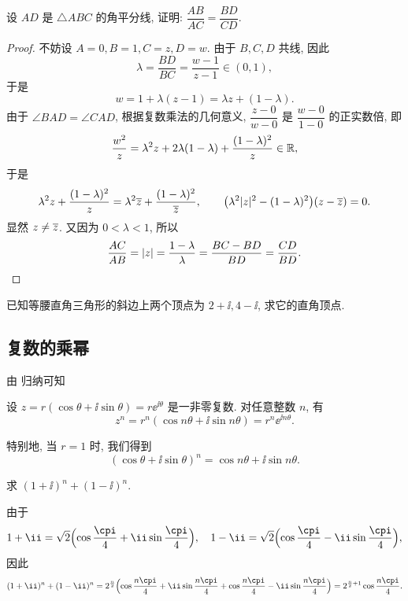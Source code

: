 \begin{example}
  设 $AD$ 是 $\triangle ABC$ 的角平分线, 证明: $\dfrac{AB}{AC}=\dfrac{BD}{CD}$.
\end{example}

\begin{proof}
  不妨设 $A=0,B=1,C=z,D=w$. 由于 $B,C,D$ 共线, 因此
  \[
     \lambda
    =\frac{BD}{BC}
    =\frac{w-1}{z-1}\in(0,1),
  \]
  于是
  \[
     w
    =1+\lambda(z-1)
    =\lambda z+(1-\lambda).
  \]
  由于 $\angle BAD=\angle CAD$, 根据复数乘法的几何意义,
  $\dfrac{z-0}{w-0}$ 是 $\dfrac{w-0}{1-0}$ 的正实数倍, 即
  \[
     \frac{w^2}z
    =\lambda^2 z+2\lambda(1-\lambda)+\frac{(1-\lambda)^2}z\in{\mathbb{R}},
  \]
  于是
  \[
     \lambda^2z+\frac{(1-\lambda)^2}z
    =\lambda^2\overline z+\frac{(1-\lambda)^2}{\overline z},\qquad
    \bigl(\lambda^2|z|^2-(1-\lambda)^2\bigr)(z-\overline z)=0.
  \]
  显然 $z\neq \overline z$.
  又因为 $0<\lambda<1$, 所以
  \[
     \frac{AC}{AB}
    =|z|
    =\frac{1-\lambda}{\lambda}
    =\frac{BC-BD}{BD}
    =\frac{CD}{BD}.\qedhere
  \]
\end{proof}

\begin{exercise}
  已知等腰直角三角形的斜边上两个顶点为 $2+\ii,4-\ii$, 求它的直角顶点.
\end{exercise}


\subsection{复数的乘幂}

由 归纳可知
\begin{theorem}
  设 $z=r(\cos\theta+\ii\sin\theta)=r\ee^{\ii\theta}$ 是一非零复数.
  对任意整数 $n$, 有
  \[
    z^n=r^n(\cos{n\theta}+\ii\sin{n\theta})
    =r^n\ee^{\ii n\theta}.
  \]
\end{theorem}
特别地, 当 $r=1$ 时, 我们得到
\[
  (\cos\theta+\ii\sin\theta)^n=\cos{n\theta}+\ii\sin{n\theta}.
\]

\begin{example}
  求 $(1+\ii)^n+(1-\ii)^n$.
\end{example}

\begin{solution}
  由于
  \[
    1+\ii=\sqrt2\Bigl(\cos\frac\cpi4+\ii\sin\frac\cpi4\Bigr),\quad
    1-\ii=\sqrt2\Bigl(\cos\frac\cpi4-\ii\sin\frac\cpi4\Bigr),
  \]
  因此
  \[
     (1+\ii)^n+(1-\ii)^n
    =2^{\frac n2}\Bigl(\cos\frac{n\cpi}4+\ii\sin\frac{n\cpi}4 
      +\cos\frac{n\cpi}4-\ii\sin\frac{n\cpi}4\Bigr)
    =2^{\frac n2+1}\cos\frac{n\cpi}4.
  \]
\end{solution}

